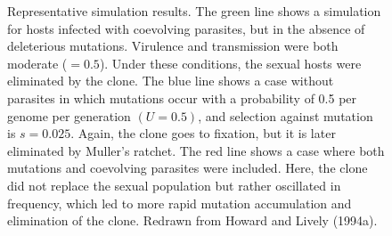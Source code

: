 \documentclass[
  letterpaper,
]{book}
\begin{document}
\begin{figure}


\caption[Representative simulation
results]{\label{fig-6-3}Representative simulation results. The green
line shows a simulation for hosts infected with coevolving parasites,
but in the absence of deleterious mutations. Virulence and transmission
were both moderate (\(= 0.5\)). Under these conditions, the sexual hosts
were eliminated by the clone. The blue line shows a case without
parasites in which mutations occur with a probability of 0.5 per genome
per generation \((U = 0.5)\), and selection against mutation is
\(s = 0.025\). Again, the clone goes to fixation, but it is later
eliminated by Muller's ratchet. The red line shows a case where both
mutations and coevolving parasites were included. Here, the clone did
not replace the sexual population but rather oscillated in frequency,
which led to more rapid mutation accumulation and elimination of the
clone. Redrawn from Howard and Lively (1994a).}

\end{figure}%
\end{document}
